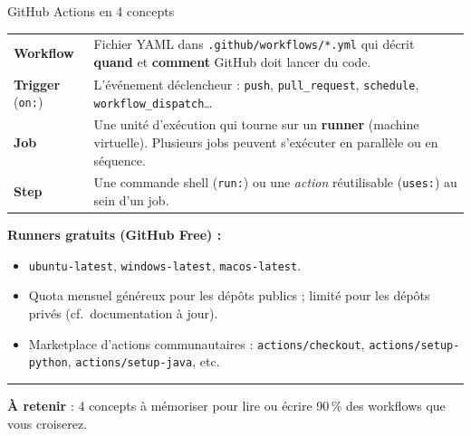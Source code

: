 \documentclass[aspectratio=169,11pt]{beamer}
\newcommand{\takeaway}[1]{%
\vfill\begin{beamercolorbox}[wd=\linewidth,sep=0.4em]{}
\color{accent2}\rule[0.6ex]{1.2em}{1.2pt}\hspace{0.4em}%
\textbf{\color{accent2}\small À retenir} \textcolor{textsoft}{:} %
{\small\color{textmain}#1}
\end{beamercolorbox}}
\begin{document}
\begin{frame}[t,shrink=10]{GitHub Actions en 4 concepts}
\footnotesize
\begin{tabular}{@{}p{2.6cm} p{12cm}@{}}
\toprule
\textbf{\color{accent}Workflow} & 
Fichier YAML dans \texttt{.github/workflows/*.yml} qui décrit \textbf{quand} et \textbf{comment} GitHub doit lancer du code. \\
\addlinespace[0.15em]
\textbf{\color{accent}Trigger} (\texttt{on:}) & 
L'événement déclencheur : \texttt{push}, \texttt{pull\_request}, \texttt{schedule}, \texttt{workflow\_dispatch}\ldots \\
\addlinespace[0.15em]
\textbf{\color{accent}Job} & 
Une unité d'exécution qui tourne sur un \textbf{runner} (machine virtuelle). Plusieurs jobs peuvent s'exécuter en parallèle ou en séquence. \\
\addlinespace[0.15em]
\textbf{\color{accent}Step} & 
Une commande shell (\texttt{run:}) ou une \emph{action} réutilisable (\texttt{uses:}) au sein d'un job. \\
\bottomrule
\end{tabular}
\vspace{0.5cm}

\textbf{Runners gratuits (GitHub Free) :}
\begin{itemize}\itemsep0.05em
\item \texttt{ubuntu-latest}, \texttt{windows-latest}, \texttt{macos-latest}.
\item Quota mensuel généreux pour les dépôts publics ; limité pour les dépôts privés (cf.\ documentation à jour).
\item Marketplace d'actions communautaires : \texttt{actions/checkout}, \texttt{actions/setup-python}, \texttt{actions/setup-java}, etc.
\end{itemize}
\takeaway{4 concepts à mémoriser pour lire ou écrire 90\,\% des workflows que vous croiserez.}
\end{frame}
\end{document}
